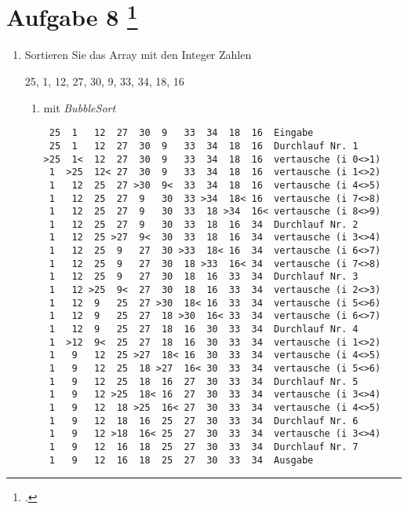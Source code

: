 \documentclass{bschlangaul-aufgabe}
\begin{document}
\section{Aufgabe 8
\footcite{examen:46115:2016:03}}

\begin{enumerate}


\item Sortieren Sie das Array mit den Integer Zahlen

\begin{center}
25, 1, 12, 27, 30, 9, 33, 34, 18, 16
\end{center}

\begin{enumerate}


\item mit \emph{BubbleSort}

\begin{liAntwort}
\footnotesize
\begin{verbatim}
 25  1   12  27  30  9   33  34  18  16  Eingabe
 25  1   12  27  30  9   33  34  18  16  Durchlauf Nr. 1
>25  1<  12  27  30  9   33  34  18  16  vertausche (i 0<>1)
 1  >25  12< 27  30  9   33  34  18  16  vertausche (i 1<>2)
 1   12  25  27 >30  9<  33  34  18  16  vertausche (i 4<>5)
 1   12  25  27  9   30  33 >34  18< 16  vertausche (i 7<>8)
 1   12  25  27  9   30  33  18 >34  16< vertausche (i 8<>9)
 1   12  25  27  9   30  33  18  16  34  Durchlauf Nr. 2
 1   12  25 >27  9<  30  33  18  16  34  vertausche (i 3<>4)
 1   12  25  9   27  30 >33  18< 16  34  vertausche (i 6<>7)
 1   12  25  9   27  30  18 >33  16< 34  vertausche (i 7<>8)
 1   12  25  9   27  30  18  16  33  34  Durchlauf Nr. 3
 1   12 >25  9<  27  30  18  16  33  34  vertausche (i 2<>3)
 1   12  9   25  27 >30  18< 16  33  34  vertausche (i 5<>6)
 1   12  9   25  27  18 >30  16< 33  34  vertausche (i 6<>7)
 1   12  9   25  27  18  16  30  33  34  Durchlauf Nr. 4
 1  >12  9<  25  27  18  16  30  33  34  vertausche (i 1<>2)
 1   9   12  25 >27  18< 16  30  33  34  vertausche (i 4<>5)
 1   9   12  25  18 >27  16< 30  33  34  vertausche (i 5<>6)
 1   9   12  25  18  16  27  30  33  34  Durchlauf Nr. 5
 1   9   12 >25  18< 16  27  30  33  34  vertausche (i 3<>4)
 1   9   12  18 >25  16< 27  30  33  34  vertausche (i 4<>5)
 1   9   12  18  16  25  27  30  33  34  Durchlauf Nr. 6
 1   9   12 >18  16< 25  27  30  33  34  vertausche (i 3<>4)
 1   9   12  16  18  25  27  30  33  34  Durchlauf Nr. 7
 1   9   12  16  18  25  27  30  33  34  Ausgabe
\end{verbatim}
\end{liAntwort}


\end{enumerate}
\end{enumerate}
\end{document}
